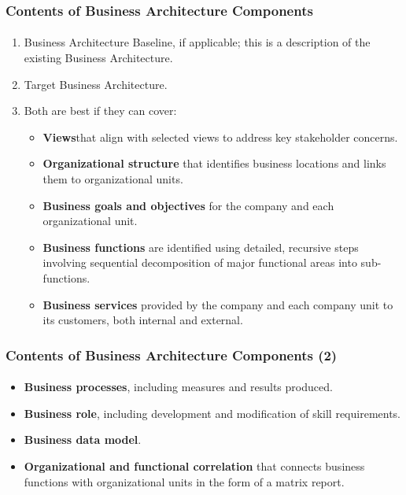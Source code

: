 \documentclass[aspectratio=169, table]{beamer}
\begin{document}
\begin{frame}
    \frametitle{Contents of Business Architecture Components}
     \framesubtitle{\hspace{1cm}}
    \begin{enumerate}
        \item Business Architecture Baseline, if applicable; this is a description of the existing Business Architecture.
         \item Target Business Architecture.
         \item Both are best if they can cover:
        \begin{itemize}
        	\item \textbf{Views}that align with selected views to address key stakeholder concerns.
        	\item \textbf{Organizational structure} that identifies business locations and links them to organizational units.
        	\item \textbf{Business goals and objectives} for the company and each organizational unit.
        	\item \textbf{Business functions} are identified using detailed, recursive steps involving sequential decomposition of major functional areas into sub-functions.
        	\item \textbf{Business services} provided by the company and each company unit to its customers, both internal and external.
        \end{itemize}
    \end{enumerate}
\end{frame}


\begin{frame}
    \frametitle{Contents of Business Architecture Components (2)}
     \framesubtitle{\hspace{1cm}}
    \begin{itemize}
        \item \textbf{Business processes}, including measures and results produced.
        \item \textbf{Business role}, including development and modification of skill requirements.
        \item \textbf{Business data model}.
        \item \textbf{Organizational and functional correlation} that connects business functions with organizational units in the form of a matrix report.
    \end{itemize}
\end{frame}
\end{document}
